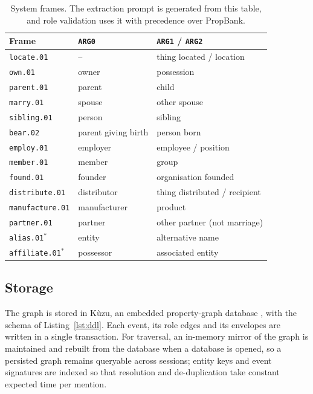\documentclass[preprint,12pt,authoryear]{elsarticle}
\begin{document}
\begin{table}[t]
\centering\small
\caption{System frames. The extraction prompt is generated from this table, and role validation uses it with precedence over PropBank.}
\label{tab:frames}
\begin{tabular}{lll}
\toprule
Frame & \texttt{ARG0} & \texttt{ARG1} / \texttt{ARG2} \\
\midrule
\texttt{locate.01} & -- & thing located / location \\
\texttt{own.01} & owner & possession \\
\texttt{parent.01} & parent & child \\
\texttt{marry.01} & spouse & other spouse \\
\texttt{sibling.01} & person & sibling \\
\texttt{bear.02} & parent giving birth & person born \\
\texttt{employ.01} & employer & employee / position \\
\texttt{member.01} & member & group \\
\texttt{found.01} & founder & organisation founded \\
\texttt{distribute.01} & distributor & thing distributed / recipient \\
\texttt{manufacture.01} & manufacturer & product \\
\texttt{partner.01} & partner & other partner (not marriage) \\
\midrule
\texttt{alias.01}$^*$ & entity & alternative name \\
\texttt{affiliate.01}$^*$ & possessor & associated entity \\
\bottomrule
\end{tabular}
\par{}
\end{table}

\subsection{Storage}

The graph is stored in K\`uzu, an embedded property-graph database \citep{feng2023kuzu}, with the schema of Listing~\ref{lst:ddl}.
Each event, its role edges and its envelopes are written in a single transaction.
For traversal, an in-memory mirror of the graph is maintained and rebuilt from the database when a database is opened, so a persisted graph remains queryable across sessions; entity keys and event signatures are indexed so that resolution and de-duplication take constant expected time per mention.
\end{document}

